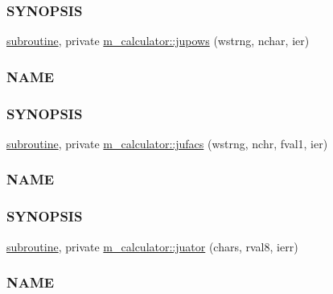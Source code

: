 \begin{DoxyCompactItemize}
\begin{DoxyCompactList}
\subsubsection*{S\+Y\+N\+O\+P\+S\+IS}\end{DoxyCompactList}\item 
\hyperlink{M__stopwatch_83_8txt_acfbcff50169d691ff02d4a123ed70482}{subroutine}, private \hyperlink{namespacem__calculator_ae1afc2ee970ad4635cce19b9b8b74f1c}{m\+\_\+calculator\+::jupows} (wstrng, nchar, ier)
\begin{DoxyCompactList}\small\item\em \subsubsection*{N\+A\+ME}

\subsubsection*{S\+Y\+N\+O\+P\+S\+IS}\end{DoxyCompactList}\item 
\hyperlink{M__stopwatch_83_8txt_acfbcff50169d691ff02d4a123ed70482}{subroutine}, private \hyperlink{namespacem__calculator_a78c73098f0fcf1130ea9f5f3748bef7d}{m\+\_\+calculator\+::jufacs} (wstrng, nchr, fval1, ier)
\begin{DoxyCompactList}\small\item\em \subsubsection*{N\+A\+ME}

\subsubsection*{S\+Y\+N\+O\+P\+S\+IS}\end{DoxyCompactList}\item 
\hyperlink{M__stopwatch_83_8txt_acfbcff50169d691ff02d4a123ed70482}{subroutine}, private \hyperlink{namespacem__calculator_a99dafdeb0fe1a589face7a3eaf5c66bd}{m\+\_\+calculator\+::juator} (chars, rval8, ierr)
\begin{DoxyCompactList}\small\item\em \subsubsection*{N\+A\+ME}


\end{DoxyCompactList}
\end{DoxyCompactItemize}
